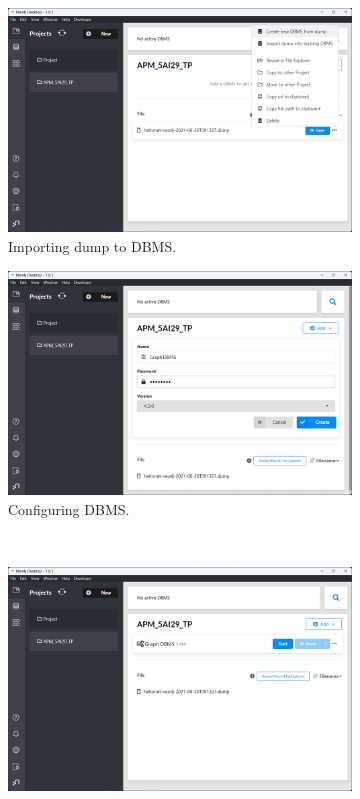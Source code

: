 \begin{figure}
    \begin{subfigure}[b]{0.49\textwidth}
        \centering
        \includegraphics[width=\textwidth]{images/neo4j-setup/3}
        \caption{Importing dump to DBMS.}
    \end{subfigure}
    \hfill
    \begin{subfigure}[b]{0.49\textwidth}
        \centering
        \includegraphics[width=\textwidth]{images/neo4j-setup/4}
        \caption{Configuring DBMS.}
    \end{subfigure}
    \\
    \begin{subfigure}[b]{0.49\textwidth}
        \centering
        \includegraphics[width=\textwidth]{images/neo4j-setup/5}

\end{subfigure}
\end{figure}
